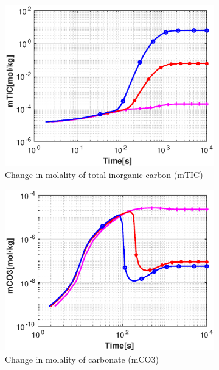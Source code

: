 \begin{figure}[!h]
        \hfill
    \begin{subfigure}{.5\linewidth}
            \centering
        \includegraphics[width=\textwidth]{PICTURES/with_CO2_mTIC.eps}
        \caption{Change in molality of total inorganic carbon (mTIC)}
        \label{fig:CO2mTIC}
    \end{subfigure}%
    \hfill
    \begin{subfigure}{.5\linewidth}
            \centering
        \includegraphics[width=\textwidth]{PICTURES/with_CO2_mCO3.eps}
        \caption{Change in molality of carbonate (mCO3)}
        \label{fig:CO2mCO3}
    \end{subfigure}%
    \hfill
    \begin{subfigure}{.5\linewidth}

\end{subfigure}
\end{figure}
